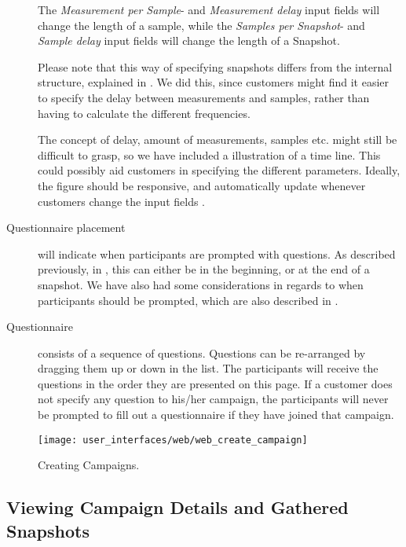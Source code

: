 \begin{description}
    The \emph{Measurement per Sample}- and \emph{Measurement delay} input fields will change the length of a sample, while the \emph{Samples per Snapshot}- and \emph{Sample delay} input fields will change the length of a Snapshot. 

    Please note that this way of specifying snapshots differs from the internal structure, explained in . We did this, since customers might find it easier to specify the delay between measurements and samples, rather than having to calculate the different frequencies. 

    The concept of delay, amount of measurements, samples etc. might still be difficult to grasp, so we have included a illustration of a time line. This could possibly aid customers in specifying the different parameters. Ideally, the figure should be responsive, and automatically update whenever customers change the input fields . 

    \item[Questionnaire placement] will indicate when participants are prompted with questions. As described previously, in , this can either be in the beginning, or at the end of a snapshot. We have also had some considerations in regards to when participants should be prompted, which are also described in .

    \item[Questionnaire] consists of a sequence of questions. Questions can be re-arranged by dragging them up or down in the list. The participants will receive the questions in the order they are presented on this page. If a customer does not specify any question to his/her campaign, the participants will never be prompted to fill out a questionnaire if they have joined that campaign.
\end{description}

\begin{figure}[!htbp]
\centering
\texttt{[image: user\_interfaces/web/web\_create\_campaign]}
\caption{Creating Campaigns.}
\label{fig:web_create_campaign}
\end{figure}
\FloatBarrier

\subsection{Viewing Campaign Details and Gathered Snapshots}

